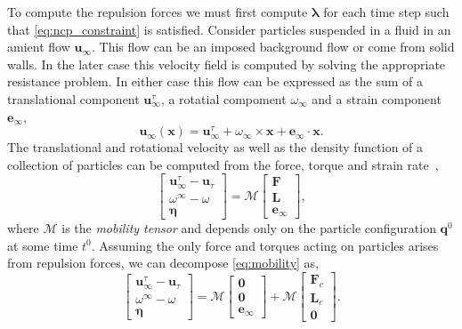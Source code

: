 \documentclass[preprint, 10pt]{elsarticle}
\begin{document}
To compute the repulsion forces we must first compute $\pmb{\lambda}$ for each time step such that \eqref{eq:ncp_constraint} is satisfied.
Consider particles suspended in a fluid in an amient flow $\mathbf{u}_\infty$. This flow can be an imposed background flow or come from solid walls. In the later case this velocity field is computed by solving the appropriate resistance problem. In either case this flow can be expressed as the sum of a translational component $\mathbf{u}_{\infty}^\tau$, a rotatial compoment $\omega_{\infty}$ and a strain component $\mathbf{e}_{\infty}$,
\[ \mathbf{u}_{\infty}(\mathbf{x}) =   \mathbf{u}_{\infty}^\tau + \omega_\infty\times \mathbf{x} + \mathbf{e}_\infty \cdot\mathbf{x}.\]
The translational and rotational velocity as well as the density
function of a collection of particles can be computed from the force,
torque and strain rate~\cite{Karrila1991},
\begin{equation}\label{eq:mobility} \begin{bmatrix} \mathbf{u}_\infty^\tau - \mathbf{u}_\tau\\ \omega^\infty - \omega \\\pmb{\eta}\end{bmatrix} = \mathcal{M}\begin{bmatrix}\mathbf{F}\\\mathbf{L}\\\mathbf{e}_\infty\end{bmatrix},\end{equation}
where $\mathcal{M}$ is the {\em mobility tensor} and depends only on the
particle configuration $\mathbf{q}^0$ at some time $t^0$. Assuming the
only force and torques acting on particles arises from repulsion forces,
we can decompose \eqref{eq:mobility} as,
\[ \begin{bmatrix} \mathbf{u}_\infty^\tau - \mathbf{u}_\tau\\ \omega^\infty - \omega \\\pmb{\eta}\end{bmatrix} = \mathcal{M}\begin{bmatrix}\mathbf{0}\\\mathbf{0}\\\mathbf{e}_\infty\end{bmatrix} + \mathcal{M}\begin{bmatrix}\mathbf{F}_c\\\mathbf{L}_c\\\mathbf{0}\end{bmatrix}.\]
\end{document}
